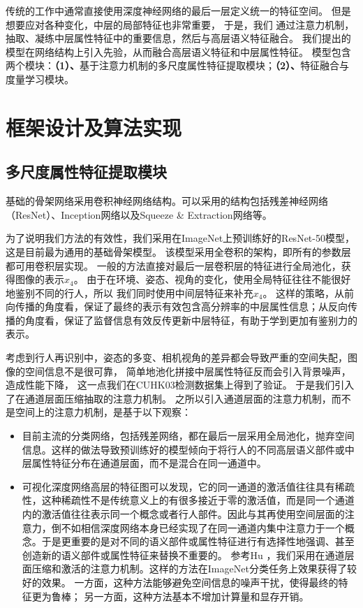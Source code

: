 传统的工作中通常直接使用深度神经网络的最后一层定义统一的特征空间。
但是想要应对各种变化，中层的局部特征也非常重要\cite{yu2017devil}，
于是，我们 
通过注意力机制，抽取、凝练中层属性特征中的重要信息，然后与高层语义特征融合。
我们提出的模型在网络结构上引入先验，从而融合高层语义特征和中层属性特征。
模型包含两个模块：\textbf{（1）、}基于注意力机制的多尺度属性特征提取模块；\textbf{（2）、}特征融合与度量学习模块。

\section{框架设计及算法实现}

\subsection{多尺度属性特征提取模块}

基础的骨架网络采用卷积神经网络结构。可以采用的结构包括残差神经网络（ResNet）\cite{he2016identity}、Inception网络\cite{szegedy2015going}以及Squeeze \& Extraction网络\cite{hu2017senet}等。

为了说明我们方法的有效性，我们采用在ImageNet上预训练好的ResNet-50模型，这是目前最为通用的基础骨架模型。
该模型采用全卷积的架构，即所有的参数层都可用卷积层实现。
一般的方法直接对最后一层卷积层的特征进行全局池化，获得图像的表示$x_4$。
由于在环境、姿态、视角的变化，使用全局特征往往不能很好地鉴别不同的行人，所以
我们同时使用中间层特征来补充$x_4$。
这样的策略，从前向传播的角度看，保证了最终的表示有效包含高分辨率的中层属性信息；从反向传播的角度看，保证了监督信息有效反传更新中层特征，有助于学到更加有鉴别力的表示。

考虑到行人再识别中，姿态的多变、相机视角的差异都会导致严重的空间失配，图像的空间信息不是很可靠，
简单地池化拼接中层属性特征反而会引入背景噪声，造成性能下降，
这一点我们在CUHK03检测数据集上得到了验证。
于是我们引入了在通道层面压缩抽取的注意力机制。
之所以引入通道层面的注意力机制，而不是空间上的注意力机制，是基于以下观察：
\begin{itemize}
	\item 目前主流的分类网络，包括残差网络，都在最后一层采用全局池化，抛弃空间信息。这样的做法导致预训练好的模型倾向于将行人的不同高层语义部件或中层属性特征分布在通道层面，而不是混合在同一通道中。
	\item 可视化深度网络高层的特征图可以发现，它的同一通道的激活值往往具有稀疏性，这种稀疏性不是传统意义上的有很多接近于零的激活值，而是同一个通道内的激活值往往表示同一个概念或者行人部件。因此与其再使用空间层面的注意力，倒不如相信深度网络本身已经实现了在同一通道内集中注意力于一个概念。于是更重要的是对不同的语义部件或属性特征进行有选择性地强调、甚至创造新的语义部件或属性特征来替换不重要的。
	参考Hu \etal \cite{hu2017senet}，我们采用在通道层面压缩和激活的注意力机制。这样的方法在ImageNet分类任务上效果获得了较好的效果。
	一方面，这种方法能够避免空间信息的噪声干扰，使得最终的特征更为鲁棒；
	另一方面，这种方法基本不增加计算量和显存开销。	
\end{itemize}

